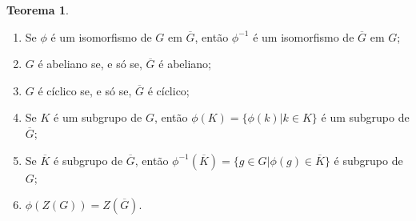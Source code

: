 \documentclass[a4paper,portuguese,11pt,twoside, leqno]{book}
\theoremstyle{definition}
\newtheorem{theorem}{Teorema}[section]
\begin{document}
	\begin{theorem}
		\label{isomorfismos em grupos}
		\begin{enumerate}
			\item Se $\phi$ é um isomorfismo de $G$ em $\overline{G}$, então $\phi ^{-1}$ é um isomorfismo de $\overline{G}$ em $G$;
			\item $G$ é abeliano se, e só se, $\overline{G}$ é abeliano;
			\item $G$ é cíclico se, e só se, $\overline{G}$ é cíclico;
			\item Se $K$ é um subgrupo de $G$, então $\phi(K) = \{\phi(k)|k\in K\}$ é um subgrupo de $\overline{G}$;
			\item Se $\overline{K}$ é subgrupo de $\overline{G}$, então $\phi^{-1}(\overline{K}) = \{ g\in G|\phi(g)\in\overline{K}\}$ é subgrupo de $G$;
			\item $\phi(Z(G)) = Z(\overline{G})$.
		\end{enumerate}	
	\end{theorem}
\end{document}
